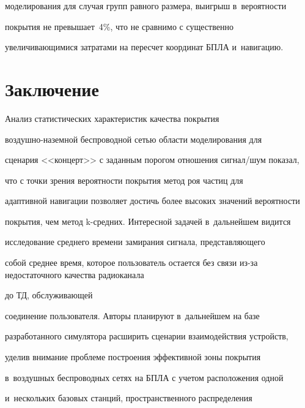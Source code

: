 моделирования для случая групп равного размера, выигрыш в~вероятности 


покрытия не превышает~4\%, что не сравнимо с существенно 


увеличивающимися затратами на пересчет координат БПЛА и~навигацию.


  


  \vspace*{-6pt}


  


  \section{Заключение}


  


  \vspace*{-4pt}


  


  Анализ статистических характеристик качества покрытия  


воз\-душ\-но-на\-зем\-ной беспроводной сетью области моделирования для 


сценария <<концерт>> с заданным порогом отношения сигнал\!/\!шум показал, 


что с точки зрения вероятности покрытия метод роя частиц для 


адаптивной навигации позволяет достичь более высоких значений вероятности 


покрытия, чем метод k-сред\-них. Интересной задачей в~дальнейшем видится 


исследование среднего времени замирания сигнала, представляющего 


собой среднее время, которое пользователь остается без связи из-за недостаточного качества радиоканала


 до ТД, обслуживающей 


соединение пользователя. Авторы планируют в~дальнейшем на базе 


разработанного симулятора расширить сценарии взаимодействия устройств, 


уделив внимание проблеме построения эффективной зоны покрытия 


в~воздушных беспроводных сетях на БПЛА с учетом расположения одной 


и~нескольких базовых станций, пространственного распределения 


